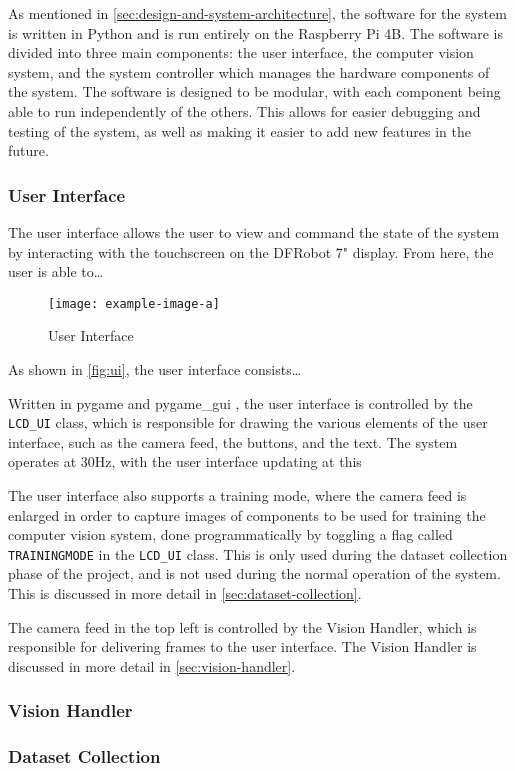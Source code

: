 As mentioned in \autoref{sec:design-and-system-architecture}, the software for the system is written in Python and is run entirely on the Raspberry Pi 4B. The software is divided into three main components: the user interface, the computer vision system, and the system controller which manages the hardware components of the system. The software is designed to be modular, with each component being able to run independently of the others. This allows for easier debugging and testing of the system, as well as making it easier to add new features in the future.

\subsubsection{User Interface}
The user interface allows the user to view and command the state of the system by interacting with the touchscreen on the DFRobot 7" display. From here, the user is able to\dots

\begin{figure}[H]
    \hfill
    \begin{minipage}[t]{\textwidth}
      \centering
      \texttt{[image: example-image-a]}
      \caption{User Interface}
      \label{fig:ui}
    \end{minipage}
\end{figure}


As shown in \autoref{fig:ui}, the user interface consists\dots

Written in pygame \cite{pygamedoc} and pygame\_gui \cite{pygamegui}, the user interface is controlled by the \texttt{LCD\_UI} class, which is responsible for drawing the various elements of the user interface, such as the camera feed, the buttons, and the text. The system operates at 30Hz, with the user interface updating at this 

The user interface also supports a training mode, where the camera feed is enlarged in order to capture images of components to be used for training the computer vision system, done programmatically by toggling a flag called \texttt{TRAININGMODE} in the \texttt{LCD\_UI} class. This is only used during the dataset collection phase of the project, and is not used during the normal operation of the system. This is discussed in more detail in \autoref{sec:dataset-collection}.

The camera feed in the top left is controlled by the Vision Handler, which is responsible for delivering frames to the user interface. The Vision Handler is discussed in more detail in \autoref{sec:vision-handler}. 

\subsubsection{Vision Handler}
\label{sec:vision-handler}

\subsubsection{Dataset Collection}
\label{sec:dataset-collection}
